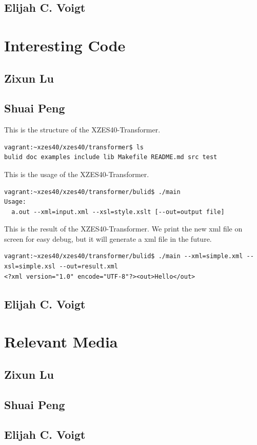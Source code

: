 \subsection{Elijah C. Voigt}

\section{Interesting Code}

\subsection{Zixun Lu}

\subsection{Shuai Peng}
This is the structure of the XZES40-Transformer.
\begin{lstlisting}
vagrant:~xzes40/xzes40/transformer$ ls
bulid doc examples include lib Makefile README.md src test
\end{lstlisting}

This is the usage of the XZES40-Transformer.
\begin{lstlisting}
vagrant:~xzes40/xzes40/transformer/bulid$ ./main
Usage:
  a.out --xml=input.xml --xsl=style.xslt [--out=output file]
\end{lstlisting}

This is the result of the XZES40-Transformer. We print the new xml file on screen for easy debug, but it will generate a xml file in the future.
\begin{lstlisting}
vagrant:~xzes40/xzes40/transformer/bulid$ ./main --xml=simple.xml --xsl=simple.xsl --out=result.xml
<?xml version="1.0" encode="UTF-8"?><out>Hello</out>

\end{lstlisting}

\subsection{Elijah C. Voigt}


\section{Relevant Media}

\subsection{Zixun Lu}

\subsection{Shuai Peng}

\subsection{Elijah C. Voigt}

\printbibliography


